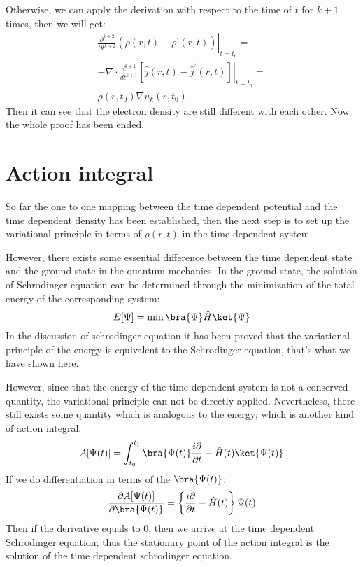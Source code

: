 Otherwise, we can apply the derivation with respect to the time of
$t$ for $k+1$ times, then we will get:
\begin{multline}\label{}
\left.\frac{\partial^{k+2}}{\partial t^{k+2}}(\rho(r,t) -
\rho^{'}(r,t))\right|_{t=t_{0}} = \\
-\nabla\cdot\frac{d^{k+1}}{dt^{k+1}}\left.[\hat{j}(r,t)-
\hat{j}^{'}(r,t)]
\right|_{t=t_{0}} = \\
\rho(r,t_{0})\nabla u_{k}(r,t_{0})
\end{multline}
Then it can see that the electron density are still different with
each other. Now the whole proof has been ended.



\section{Action integral}\label{TDDFT:5}
%
%
So far the one to one mapping between the time dependent potential
and the time dependent density has been established, then the next
step is to set up the variational principle in terms of $\rho(r,t)$
in the time dependent system.

However, there exists some essential difference between the time
dependent state and the ground state in the quantum mechanics. In
the ground state, the solution of Schrodinger equation can be
determined through the minimization of the total energy of the
corresponding system:
\begin{equation}\label{}
E[\Psi] = \min\bra{\Psi}\hat{H}\ket{\Psi}
\end{equation}
In the discussion of schrodinger equation it has been proved that
the variational principle of the energy is equivalent to the
Schrodinger equation, that's what we have shown here.

However, since that the energy of the time dependent system is not a
conserved quantity, the variational principle can not be directly
applied. Nevertheless, there still exists some quantity which is
analogous to the energy; which is another kind of action integral:
\begin{equation}\label{}
A[\Psi(t)] =
\int^{t_{1}}_{t_{0}}\bra{\Psi(t)}\frac{i\partial}{\partial
t}-\hat{H}(t)\ket{\Psi(t)}
\end{equation}
If we do differentiation in terms of the $\bra{\Psi(t)}$:
\begin{equation}\label{}
\frac{\partial A[\Psi(t)]}{\partial \bra{\Psi(t)}} =
\left\{\frac{i\partial}{\partial t}-\hat{H}(t)\right\}\Psi(t)
\end{equation}
Then if the derivative equals to $0$, then we arrive at the time
dependent Schrodinger equation; thus the stationary point of the
action integral is the solution of the time dependent schrodinger
equation.

